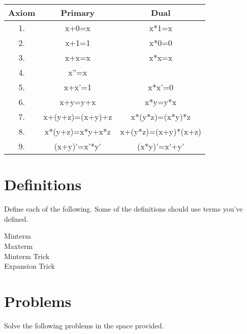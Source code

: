 \vspace{0.2in}

\begin{tabular}[ht]{|c|c|c|}\hline
Axiom	&	Primary &	Dual	\\ \hline
1.	&	x+0=x	&	x*1=x	\\ \hline
2.	&	x+1=1	&	x*0=0	\\ \hline
3.	&	x+x=x	&	x*x=x	\\ \hline
4.	&	x''=x	&	     	\\ \hline
5.	&	x+x'=1	&	x*x'=0	\\ \hline
6.	&	x+y=y+x	&	x*y=y*x\\ \hline
7.	& x+(y+z)=(x+y)+z&x*(y*z)=(x*y)*z \\ \hline
8.	& x*(y+z)=x*y+x*z  & x+(y*z)=(x+y)*(x+z)  \\ \hline
9.	& (x+y)'=x'*y'  & (x*y)'=x'+y' \\ \hline
\end{tabular}


\section{Definitions}
Define each of the following. Some of the definitions should use terms you've defined.
\begin{description}
\item[Minterm]
\item[Maxterm]
\item[Minterm Trick]
\item[Expansion Trick]
\end{description}


\section{Problems}
Solve the following problems in the space provided.

